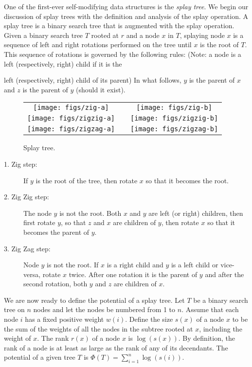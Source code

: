 One of the first-ever self-modifying data structures is the
\emph{splay tree}.  We begin our discussion of splay trees with the
definition and analysis of the splay operation. A splay tree is a
binary search tree that is augmented with the splay operation. Given a
binary search tree $T$ rooted at $r$ and a node $x$ in $T$, splaying
node $x$ is a sequence of left and right rotations performed on the
tree until $x$ is the root of $T$. This sequence of rotations is
governed by the following rules: (Note: a node is a left
(respectively, right) child if it is the {left (respectively, right)
child of its parent) In what follows, $y$ is the parent of $x$ and $z$
is the parent of $y$ (should it exist).

\begin{figure}
\begin{center}\begin{tabular}{ccc}
\texttt{[image: figs/zig-a]} & \raisebox{1cm}{zig} & \texttt{[image: figs/zig-b]} \\[1cm]
\texttt{[image: figs/zigzig-a]} & \raisebox{1cm}{zig-zig} & \texttt{[image: figs/zigzig-b]} \\[1cm]
\texttt{[image: figs/zigzag-a]} & \raisebox{1cm}{zig-zag} & \texttt{[image: figs/zigzag-b]}
\end{tabular}\end{center}
\caption{Splay tree.}
\end{figure}

\begin{description}
\item[1. Zig step:] If $y$ is the root of the tree, then rotate $x$ so
that it becomes the root.

\item[2. Zig Zig step:] The node $y$ is not the root. Both $x$ and $y$
are left (or right) children, then first rotate $y$, so that $z$ and
$x$ are children of $y$, then rotate $x$ so that it becomes the parent
of $y$.

\item[3. Zig Zag step:] Node $y$ is not the root. If $x$ is a right
child and $y$ is a left child or vice-versa, rotate $x$ twice. After
one rotation it is the parent of $y$ and after the second rotation,
both $y$ and $z$ are children of $x$.
\end{description}

We are now ready to define the potential of a splay tree. Let $T$ be a
binary search tree on $n$ nodes and let the nodes be numbered from 1
to $n$. Assume that each node $i$ has a fixed positive weight
$w(i)$. Define the size $s(x)$ of a node $x$ to be the sum of the
weights of all the nodes in the subtree rooted at $x$, including the
weight of $x$. The rank $r(x)$ of a node $x$ is $\log(s(x))$. By
definition, the rank of a node is at least as large as the rank of any
of its decendants. The potential of a given tree $T$ is $\Phi(T) =
\sum_{i=1}^n \log(s(i))$.

}
